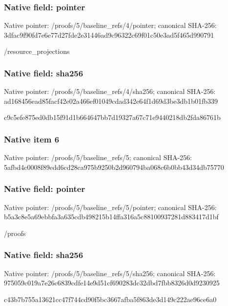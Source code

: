 \documentclass[10pt,a4paper]{article}
\begin{document}
\subsubsection{Native field: pointer}
Native pointer: /proofs/5/baseline\_\allowbreak{}refs/4/pointer; canonical SHA-256: 3dfac9f90fd7e6e77d27fde2e31446ad9c96322c69f01c50e3ad5f465d990791

\begingroup\raggedright\sloppy /\allowbreak{}resource\_\allowbreak{}projections\par\endgroup

\subsubsection{Native field: sha256}
Native pointer: /proofs/5/baseline\_\allowbreak{}refs/4/sha256; canonical SHA-256: ad168456ead85facf42e02a466ef01049cdad342e64f1d69d3be3db1b01fb339

\begingroup\raggedright\sloppy c9c5efe875ed0db15f91d1b664647bb7d19327a67c71e9440218db2fda86761b\par\endgroup

\subsubsection{Native item 6}
Native pointer: /proofs/5/baseline\_\allowbreak{}refs/5; canonical SHA-256: 5afbd4c0008f89edd6cd28ca975b9250b2d960794ba068c6b0bb43d34db75770

\subsubsection{Native field: pointer}
Native pointer: /proofs/5/baseline\_\allowbreak{}refs/5/pointer; canonical SHA-256: b5a3c8e5a69ebbfa3a635cdb498215b14ffa316a5c88100937281d883417d1bf

\begingroup\raggedright\sloppy /\allowbreak{}proofs\par\endgroup

\subsubsection{Native field: sha256}
Native pointer: /proofs/5/baseline\_\allowbreak{}refs/5/sha256; canonical SHA-256: 975059c019a7e26c6839cdfe14e9d51cf690283dc32dbd7fbb8326d0d9230925

\begingroup\raggedright\sloppy c43b7b755a13621cc47f744cd90f5bc3667afba5f863de3d149c222ae96ce6a0\par\endgroup
\end{document}
